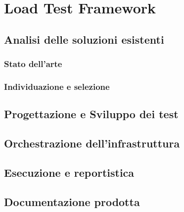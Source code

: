 
\chapter{Load Test Framework}
\label{cap:descrizione-stage}
\section{Analisi delle soluzioni esistenti}
\subsection{Stato dell'arte}
\subsection{Individuazione e selezione}
\section{Progettazione e Sviluppo dei test}
\section{Orchestrazione dell'infrastruttura}
\section{Esecuzione e reportistica}
\section{Documentazione prodotta}